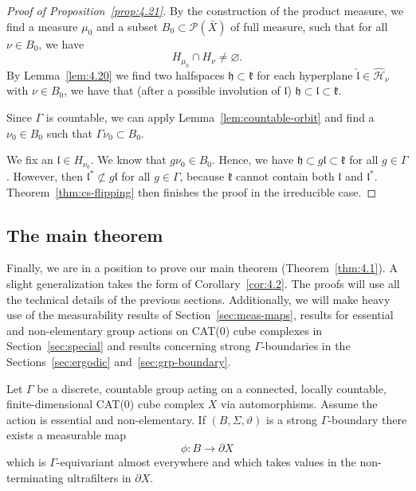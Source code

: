 \begin{proof}[Proof of Proposition~\ref{prop:4.21}]
  By the construction of the product measure, we find a measure \(\mu_0\) and a subset \(B_0 \subset \mathcal{P}(\bar X)\) of full measure, such that for all \(\nu \in B_0\), we have
  \[
    H_{\mu_0} \cap H_\nu \neq \varnothing.
  \]
  By Lemma~\ref{lem:4.20} we find two halfspaces \(\mathfrak{h} \subset \mathfrak{k}\) for each hyperplane \(\mathfrak{\hat l} \in \mathcal{\hat H}_\nu\) with \(\nu \in B_0\), we have that (after a possible involution of \(\mathfrak{l}\)) \(\mathfrak{h} \subset \mathfrak{l} \subset \mathfrak{k}\).

  Since \(\Gamma\) is countable, we can apply Lemma~\ref{lem:countable-orbit} and find a \(\nu_0 \in B_0\) such that \(\Gamma \nu_0 \subset B_0\). 

  We fix an \(\mathfrak{l} \in H_{\nu_0}\). We know that \(g\nu_0 \in B_0\). Hence, we have \(\mathfrak{h} \subset g\mathfrak{l} \subset \mathfrak{k}\) for all \(g \in \Gamma\). However, then \(\mathfrak{l}^\ast \not \subset g\mathfrak{l}\) for all \(g \in \Gamma\), because \(\mathfrak{k}\) cannot contain both \(\mathfrak{l}\) and \(\mathfrak{l}^\ast\). Theorem~\ref{thm:cs-flipping} then finishes the proof in the irreducible case.
\end{proof}
  
\subsection{The main theorem}
\label{sec:main-proof}

Finally, we are in a position to prove our main theorem (Theorem~\ref{thm:4.1}). A slight generalization takes the form of Corollary~\ref{cor:4.2}. The proofs will use all the technical details of the previous sections. Additionally, we will make heavy use of the measurability results of Section~\ref{sec:meas-maps}, results for essential and non-elementary group actions on CAT(0) cube complexes in Section~\ref{sec:special} and results concerning strong \(\Gamma\)-boundaries in the Sections~\ref{sec:ergodic} and~\ref{sec:grp-boundary}.

\begin{thm}[{\cite[Theorem~4.1]{MR3509968}}]
  \label{thm:4.1}
  Let \(\Gamma\) be a discrete, countable group acting on a connected, locally countable, finite-dimensional CAT(0) cube complex \(X\) via automorphisms. Assume the action is essential and non-elementary. If \((B, \Sigma, \vartheta)\) is a strong \(\Gamma\)-boundary there exists a measurable map
  \[
    \phi\colon B \to \partial X
  \]
  which is \(\Gamma\)-equivariant almost everywhere and which takes values in the non-terminating ultrafilters in \(\partial X\).
\end{thm}

